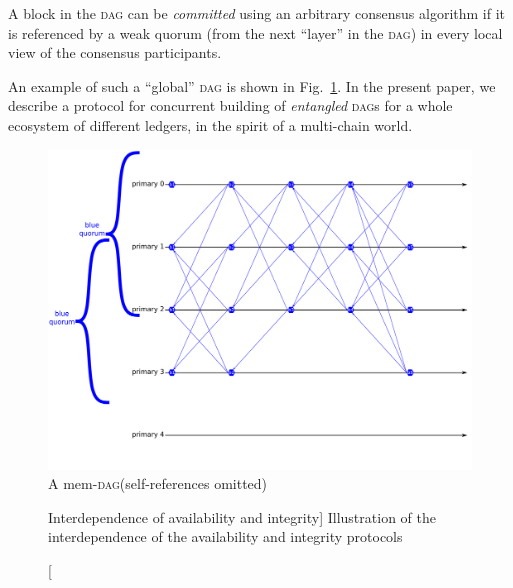 \documentclass[dvipsnames]{article}
\theoremstyle{definition}
\newcommand{\Dag}[1][]{\textsc{dag}#1\xspace}
\newcommand{\fig}[1][]{Fig.~}
\begin{document}
A block in the \Dag can be \emph{committed}
using an arbitrary consensus algorithm
if it is referenced by a weak quorum
(from the next “layer” in the \Dag)
in every local view of the consensus participants.

An example of such a “global” \Dag
is shown in \fig\ref{fig:blue_dag}.
In the present paper,
we describe a protocol for concurrent building
of \emph{entangled} \Dag[s] for a whole ecosystem of different ledgers,
in the spirit of a multi-chain world.

\begin{figure}[htb]
  \centering
  \includegraphics[width=.95\linewidth]{./blue_dag.png}
  \caption{A mem-\Dag (self-references omitted)}
  \label{fig:blue_dag}
\end{figure}


\begin{figure}[htb]
  \centering
   \protect{}
  \caption%
  [Interdependence of availability and integrity]%
  {Illustration of
    the interdependence of the availability and
    integrity protocols}
  \label{fig:availability-n-integrity}
\end{figure}
\end{document}
